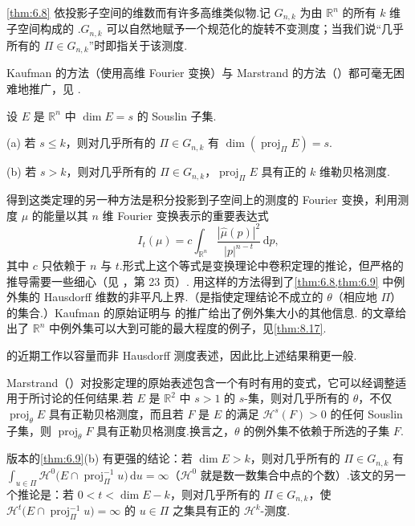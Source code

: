 \cref{thm:6.8} 依投影子空间的维数而有许多高维类似物.记 $G_{n,k}$ 为由 $\mathbb{R}^n$ 的所有 $k$ 维子空间构成的 .$G_{n,k}$ 可以自然地赋予一个规范化的旋转不变测度；当我们说``几乎所有的 $\Pi\in G_{n,k}$''时即指关于该测度.

Kaufman 的方法（使用高维 Fourier 变换）与 Marstrand 的方法（\citeyear{marstrand1954a}）都可毫无困难地推广，见 \textcite{mattila1975b}.

\begin{theorem}\label{thm:6.9}
设 $E$ 是 $\mathbb{R}^n$ 中 $\dim E=s$ 的 Souslin 子集.

(a) 若 $s\leq k$，则对几乎所有的 $\Pi\in G_{n,k}$ 有 $\dim(\operatorname{proj}_{\Pi}E)=s$.

(b) 若 $s>k$，则对几乎所有的 $\Pi\in G_{n,k}$，$\operatorname{proj}_{\Pi}E$ 具有正的 $k$ 维勒贝格测度.
\end{theorem}

得到这类定理的另一种方法是积分投影到子空间上的测度的 Fourier 变换，利用测度 $\mu$ 的能量以其 $n$ 维 Fourier 变换表示的重要表达式
\begin{equation}\label{eq:6.8}
  I_t(\mu)=c\int_{\mathbb{R}^n}\frac{|\hat{\mu}(p)|^{2}}{|p|^{n-t}}\,\mathrm{d}p,
\end{equation}
其中 $c$ 只依赖于 $n$ 与 $t$.形式上这个等式是变换理论中卷积定理的推论，但严格的推导需要一些细心（见 \textcite{carleson1967}，第 23 页）.\textcite{falconer1982} 用这样的方法得到了\cref{thm:6.8,thm:6.9} 中例外集的 Hausdorff 维数的非平凡上界.（是指使定理结论不成立的 $\theta$（相应地 $\Pi$）的集合.）Kaufman 的原始证明与 \textcite{mattila1975b} 的推广给出了例外集大小的其他信息.\textcite{kaufmanmattila1975} 的文章给出了 $\mathbb{R}^n$ 中例外集可以大到可能的最大程度的例子，见\cref{thm:8.17}.

\textcite{mattila1975b,falconer1982} 的近期工作以容量而非 Hausdorff 测度表述，因此比上述结果稍更一般.

Marstrand（\citeyear{marstrand1954a}）对投影定理的原始表述包含一个有时有用的变式，它可以经调整适用于所讨论的任何结果.若 $E$ 是 $\mathbb{R}^2$ 中 $s>1$ 的 $s$-集，则对几乎所有的 $\theta$，不仅 $\operatorname{proj}_{\theta}E$ 具有正勒贝格测度，而且若 $F$ 是 $E$ 的满足 $\mathcal{H}^s(F)>0$ 的任何 Souslin 子集，则 $\operatorname{proj}_{\theta}F$ 具有正勒贝格测度.换言之，$\theta$ 的例外集不依赖于所选的子集 $F$.

\textcite{mattila1975b} 版本的\cref{thm:6.9}(b) 有更强的结论：若 $\dim E>k$，则对几乎所有的 $\Pi\in G_{n,k}$ 有 $\int_{u\in\Pi}\mathcal{H}^0\bigl(E\cap\operatorname{proj}_{\Pi}^{-1}u\bigr)\,\mathrm{d}u=\infty$（$\mathcal{H}^0$ 就是数一数集合中点的个数）.该文的另一个推论是：若 $0<t<\dim E-k$，则对几乎所有的 $\Pi\in G_{n,k}$，使 $\mathcal{H}^t\bigl(E\cap\operatorname{proj}_{\Pi}^{-1}u\bigr)=\infty$ 的 $u\in\Pi$ 之集具有正的 $\mathcal{H}^k$-测度.

